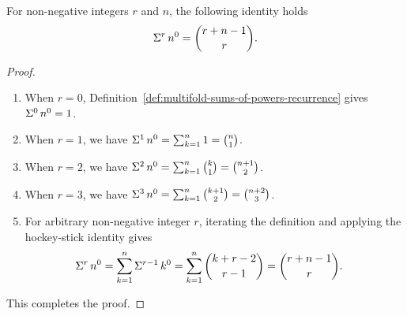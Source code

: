 \begin{lemma}
  \label{lem:multifold-sum-of-zero-powers}
  For non-negative integers $r$ and $n$, the following identity holds
  \begin{align*}
    \Sigma^{r}\,{n}^{0} = \binom{r+n-1}{r}.
  \end{align*}
  \begin{proof}
    \leavevmode\par
    \begin{enumerate}
      \item When $r=0$, Definition~\ref{def:multifold-sums-of-powers-recurrence} gives $\Sigma^{0}\,{n}^{0} = 1$.
      \item When $r=1$, we have
        $\Sigma^{1}\,{n}^{0}
        = \sum_{k=1}^{n} 1 = \binom{n}{1}$.
      \item When $r=2$, we have
        $\Sigma^{2}\,{n}^{0}
        = \sum_{k=1}^{n} \binom{k}{1}
        = \binom{n+1}{2}$.
      \item When $r=3$, we have
        $\Sigma^{3}\,{n}^{0}
        = \sum_{k=1}^{n} \binom{k+1}{2}
        = \binom{n+2}{3}$.
      \item For arbitrary non-negative integer $r$, iterating the definition and applying the hockey-stick identity gives
        \begin{align*}
          \Sigma^{r}\,{n}^{0}
          &= \sum_{k=1}^{n} \Sigma^{r-1}\,{k}^{0}
          = \sum_{k=1}^{n} \binom{k+r-2}{r-1}
          = \binom{r+n-1}{r}.
        \end{align*}
    \end{enumerate}
    This completes the proof.
  \end{proof}
\end{lemma}
